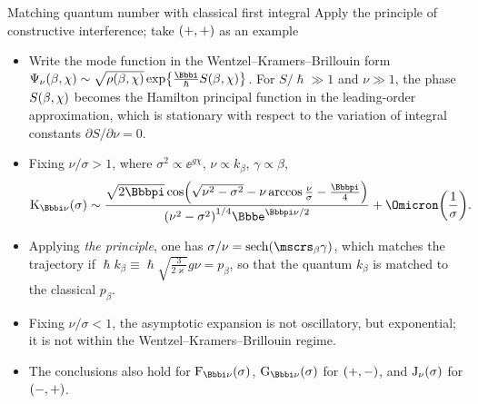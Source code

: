 \documentclass[8pt]{beamer}
\begin{document}
\begin{frame}%
{Matching quantum number with classical first integral}%
{Apply the principle of constructive interference; take ${\left(+,+\right)}$ as an
example}

\begin{itemize}
\item Write the mode function in the Wentzel--Kramers--Brillouin form
$\rfun{\Psi_{\nu}}{\beta,\chi} \sim \sqrt{\rfun{\rho}{\beta,\chi}}\,
\cfun{\exp}{\frac{\ii}{\hslash}\rfun{S}{\beta,\chi}}$.
For $S/\hslash \gg 1$ and $\nu \gg 1$, the \alert{phase}
${S}\mathopen{}\left(\beta,\chi\right)\mathclose{}$ becomes
the Hamilton principal function in the leading-order approximation, which is
\alert{stationary} with respect to the variation of integral constants
$\partial S/\partial \nu = 0$.
\end{itemize}


\begin{itemize}
\item Fixing $\nu/\sigma>1$, where $\sigma^2 \propto \ee^{g\chi}$,
$\nu \propto k_\beta$, $\gamma \propto \beta$,
\begin{align}
\rfun{\mathrm{K}_{\ii \nu}}{\sigma} \sim
\frac{\sqrt{2\pp}\,
\rfun{\cos}{\sqrt{\nu^2-\sigma^2}-\nu\arccos\frac{\nu}{\sigma}-\frac{\pp}{4}}
}{
\rbr{\nu^2-\sigma^2}^{1/4}\ee^{\pp\nu/2}}
+\rfun{\Omicron}{\frac{1}{\sigma}}.
\end{align}

\item Applying \emph{the principle},
one has
$\sigma/\nu = \rfun{\sech}{\mscrs_\beta\gamma}$, which matches the trajectory
if $\hslash k_\beta \equiv \hslash \sqrt{\frac{3}{2\varkappa}}g\nu
= p_\beta$, so that the \alert{quantum} $k_\beta$ is matched to the
\alert{classical} $p_\beta$.


\item Fixing $\nu/\sigma<1$, the asymptotic expansion is not oscillatory,
but exponential; it is not within the Wentzel--Kramers--Brillouin regime.
\end{itemize}

\begin{itemize}
\item The conclusions also hold for $\rfun{\mathrm{F}_{\ii\nu}}{\sigma}$, 
$\rfun{\mathrm{G}_{\ii\nu}}{\sigma}$ for ${\left(+,-\right)}$, and
${\mathrm{J}_{\nu}}\mathopen{}\left(\sigma\right)\mathclose{}$ for ${\left(-,+\right)}$.
\end{itemize}
\end{frame}
\end{document}
